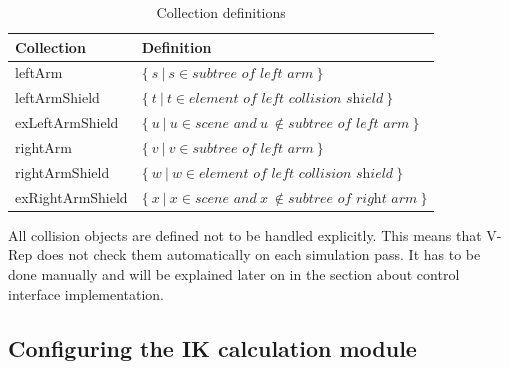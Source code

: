 \begin{table}
  \centering
  \label{fig:col_defs}
  \begin{tabular}[h]{|l|l|} \hline
	\textbf{Collection} & \textbf{Definition} \\ \hline
	leftArm & $\{~s~|~s\in\textit{subtree of left arm}~\}$ \\
	leftArmShield & $\{~t~|~t\in\textit{element of left collision shield}~\}$ \\
	exLeftArmShield & $\{~u~|~u\in\textit{scene and}~u~\notin\textit{subtree of left arm}~\}$ \\
	rightArm & $\{~v~|~v\in\textit{subtree of left arm}~\}$ \\
	rightArmShield & $\{~w~|~w\in\textit{element of left collision shield}~\}$ \\
	exRightArmShield & $\{~x~|~x\in\textit{scene and}~x~\notin\textit{subtree of right arm}~\}$ \\ \hline
  \end{tabular}
  \caption{Collection definitions}
\end{table}
All collision objects are defined not to be handled explicitly. This means that V-Rep does not check them automatically on each simulation pass. It has to be done manually and will be explained later on in the section about control interface implementation.

\subsection{Configuring the IK calculation module}

